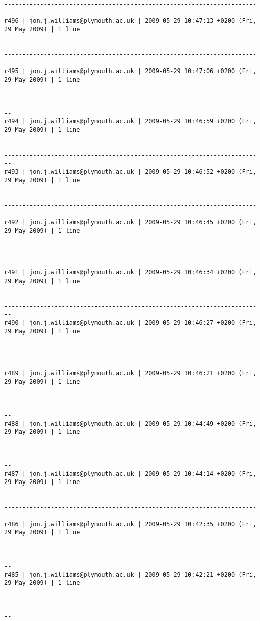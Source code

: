 \documentclass[9]{report}
\begin{document}
\begin{description}
\begin{verbatim}
------------------------------------------------------------------------
r496 | jon.j.williams@plymouth.ac.uk | 2009-05-29 10:47:13 +0200 (Fri, 29 May 2009) | 1 line


------------------------------------------------------------------------
r495 | jon.j.williams@plymouth.ac.uk | 2009-05-29 10:47:06 +0200 (Fri, 29 May 2009) | 1 line


------------------------------------------------------------------------
r494 | jon.j.williams@plymouth.ac.uk | 2009-05-29 10:46:59 +0200 (Fri, 29 May 2009) | 1 line


------------------------------------------------------------------------
r493 | jon.j.williams@plymouth.ac.uk | 2009-05-29 10:46:52 +0200 (Fri, 29 May 2009) | 1 line


------------------------------------------------------------------------
r492 | jon.j.williams@plymouth.ac.uk | 2009-05-29 10:46:45 +0200 (Fri, 29 May 2009) | 1 line


------------------------------------------------------------------------
r491 | jon.j.williams@plymouth.ac.uk | 2009-05-29 10:46:34 +0200 (Fri, 29 May 2009) | 1 line


------------------------------------------------------------------------
r490 | jon.j.williams@plymouth.ac.uk | 2009-05-29 10:46:27 +0200 (Fri, 29 May 2009) | 1 line


------------------------------------------------------------------------
r489 | jon.j.williams@plymouth.ac.uk | 2009-05-29 10:46:21 +0200 (Fri, 29 May 2009) | 1 line


------------------------------------------------------------------------
r488 | jon.j.williams@plymouth.ac.uk | 2009-05-29 10:44:49 +0200 (Fri, 29 May 2009) | 1 line


------------------------------------------------------------------------
r487 | jon.j.williams@plymouth.ac.uk | 2009-05-29 10:44:14 +0200 (Fri, 29 May 2009) | 1 line


------------------------------------------------------------------------
r486 | jon.j.williams@plymouth.ac.uk | 2009-05-29 10:42:35 +0200 (Fri, 29 May 2009) | 1 line


------------------------------------------------------------------------
r485 | jon.j.williams@plymouth.ac.uk | 2009-05-29 10:42:21 +0200 (Fri, 29 May 2009) | 1 line


------------------------------------------------------------------------


\end{verbatim}
\end{description}
\end{document}
